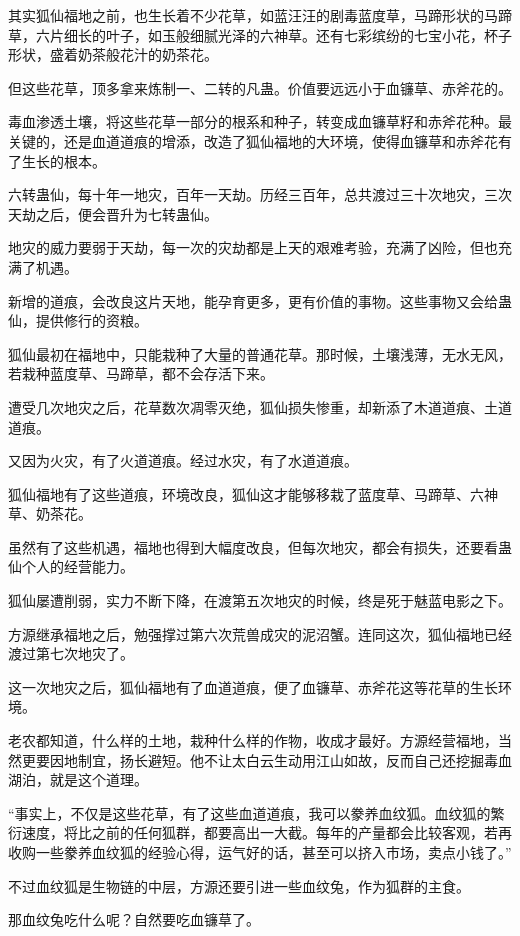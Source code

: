 \begin{this_body}
其实狐仙福地之前，也生长着不少花草，如蓝汪汪的剧毒蓝度草，马蹄形状的马蹄草，六片细长的叶子，如玉般细腻光泽的六神草。还有七彩缤纷的七宝小花，杯子形状，盛着奶茶般花汁的奶茶花。

但这些花草，顶多拿来炼制一、二转的凡蛊。价值要远远小于血镰草、赤斧花的。

毒血渗透土壤，将这些花草一部分的根系和种子，转变成血镰草籽和赤斧花种。最关键的，还是血道道痕的增添，改造了狐仙福地的大环境，使得血镰草和赤斧花有了生长的根本。

六转蛊仙，每十年一地灾，百年一天劫。历经三百年，总共渡过三十次地灾，三次天劫之后，便会晋升为七转蛊仙。

地灾的威力要弱于天劫，每一次的灾劫都是上天的艰难考验，充满了凶险，但也充满了机遇。

新增的道痕，会改良这片天地，能孕育更多，更有价值的事物。这些事物又会给蛊仙，提供修行的资粮。

狐仙最初在福地中，只能栽种了大量的普通花草。那时候，土壤浅薄，无水无风，若栽种蓝度草、马蹄草，都不会存活下来。

遭受几次地灾之后，花草数次凋零灭绝，狐仙损失惨重，却新添了木道道痕、土道道痕。

又因为火灾，有了火道道痕。经过水灾，有了水道道痕。

狐仙福地有了这些道痕，环境改良，狐仙这才能够移栽了蓝度草、马蹄草、六神草、奶茶花。

虽然有了这些机遇，福地也得到大幅度改良，但每次地灾，都会有损失，还要看蛊仙个人的经营能力。

狐仙屡遭削弱，实力不断下降，在渡第五次地灾的时候，终是死于魅蓝电影之下。

方源继承福地之后，勉强撑过第六次荒兽成灾的泥沼蟹。连同这次，狐仙福地已经渡过第七次地灾了。

这一次地灾之后，狐仙福地有了血道道痕，便了血镰草、赤斧花这等花草的生长环境。

老农都知道，什么样的土地，栽种什么样的作物，收成才最好。方源经营福地，当然更要因地制宜，扬长避短。他不让太白云生动用江山如故，反而自己还挖掘毒血湖泊，就是这个道理。

“事实上，不仅是这些花草，有了这些血道道痕，我可以豢养血纹狐。血纹狐的繁衍速度，将比之前的任何狐群，都要高出一大截。每年的产量都会比较客观，若再收购一些豢养血纹狐的经验心得，运气好的话，甚至可以挤入市场，卖点小钱了。”

不过血纹狐是生物链的中层，方源还要引进一些血纹兔，作为狐群的主食。

那血纹兔吃什么呢？自然要吃血镰草了。


\end{this_body}
